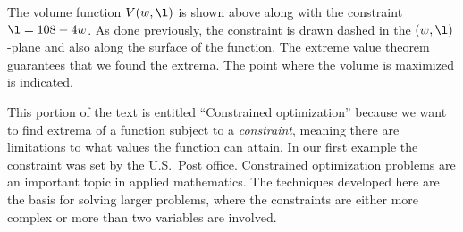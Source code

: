 \documentclass{ximera}
\begin{document}
\begin{example}
\begin{explanation}
\begin{image}
    \end{image}
    The volume function $V(w,\l)$ is shown above along with the
    constraint $\l = 108-4w$. As done previously, the constraint is
    drawn dashed in the $(w,\l)$-plane and also along the surface of
    the function. The extreme value theorem guarantees that we found
    the extrema. The point where the volume is maximized is indicated.
  \end{explanation}
\end{example}



This portion of the text is entitled ``Constrained optimization''
because we want to find extrema of a function subject to a
\textit{constraint}, meaning there are limitations to what values the
function can attain. In our first example the constraint was set by
the U.S.\ Post office.  Constrained optimization problems are an
important topic in applied mathematics. The techniques developed here
are the basis for solving larger problems, where the constraints are
either more complex or more than two variables are involved.
\end{document}
